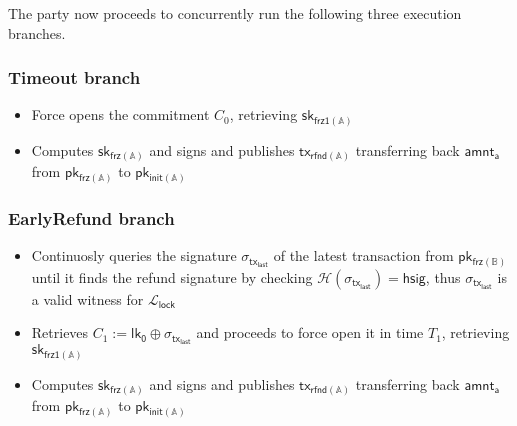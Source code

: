 \documentclass{article}      	%
\begin{document}
The party now proceeds to concurrently run the following three execution branches. \\

\subsubsection*{Timeout branch}
\begin{itemize}
    \item Force opens the commitment $C_0$, retrieving  $\mathsf{sk_{frz1(\mathbb{A})}}$
    \item Computes $\mathsf{sk_{frz(\mathbb{A})}}$ and signs and publishes $\mathsf{tx_{rfnd(\mathbb{A})}}$ transferring back $\mathsf{amnt_a}$ from $\mathsf{pk_{frz(\mathbb{A})}}$ to $\mathsf{pk_{init(\mathbb{A})}}$ \\
\end{itemize}
\subsubsection*{EarlyRefund branch}
\begin{itemize}
    \item Continuosly queries the signature $\sigma_{\mathsf{tx_{last}}}$ of the latest transaction from $\mathsf{pk_{frz(\mathbb{B})}}$ until it finds the refund signature by checking $\mathcal{H}(\sigma_{\mathsf{tx_{last}}}) = \mathsf{hsig}$, thus $\sigma_{\mathsf{tx_{last}}}$ is a valid witness for $\mathcal{L}_{\mathsf{lock}}$
    \item Retrieves $C_1 := \mathsf{lk_0} \oplus \sigma_{\mathsf{tx_{last}}}$ and proceeds to force open it in time $T_1$, retrieving $\mathsf{sk_{frz1(\mathbb{A})}}$
    \item Computes $\mathsf{sk_{frz(\mathbb{A})}}$ and signs and publishes $\mathsf{tx_{rfnd(\mathbb{A})}}$ transferring back $\mathsf{amnt_a}$ from $\mathsf{pk_{frz(\mathbb{A})}}$ to $\mathsf{pk_{init(\mathbb{A})}}$
\end{itemize}
\end{document}
